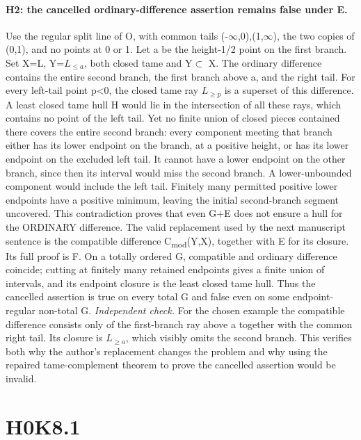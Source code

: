 \paragraph{H2: the cancelled ordinary-difference assertion remains false under E.}\label{lem:ordinarydifference}
Use the regular split line of O, with common tails (-$\infty$,0),(1,$\infty$), the two copies of (0,1), and no points at 0 or 1. Let a be the height-1/2 point on the first branch. Set X=L, Y=$L_{\leq a}$, both closed tame and Y$\subset$ X. The ordinary difference contains the entire second branch, the first branch above a, and the right tail. For every left-tail point p<0, the closed tame ray $L_{\geq p}$ is a superset of this difference. A least closed tame hull H would lie in the intersection of all these rays, which contains no point of the left tail. Yet no finite union of closed pieces contained there covers the entire second branch: every component meeting that branch either has its lower endpoint on the branch, at a positive height, or has its lower endpoint on the excluded left tail. It cannot have a lower endpoint on the other branch, since then its interval would miss the second branch. A lower-unbounded component would include the left tail. Finitely many permitted positive lower endpoints have a positive minimum, leaving the initial second-branch segment uncovered. This contradiction proves that even G+E does not ensure a hull for the ORDINARY difference.
The valid replacement used by the next manuscript sentence is the compatible difference C\textsubscript{\rm mod}(Y,X), together with E for its closure. Its full proof is F. On a totally ordered G, compatible and ordinary difference coincide; cutting at finitely many retained endpoints gives a finite union of intervals, and its endpoint closure is the least closed tame hull. Thus the cancelled assertion is true on every total G and false even on some endpoint-regular non-total G.
\emph{Independent check.} For the chosen example the compatible difference consists only of the first-branch ray above a together with the common right tail. Its closure is $L_{\geq a}$, which visibly omits the second branch. This verifies both why the author's replacement changes the problem and why using the repaired tame-complement theorem to prove the cancelled assertion would be invalid.


\section*{H0K8.1}\label{statement:H0K8.1}
